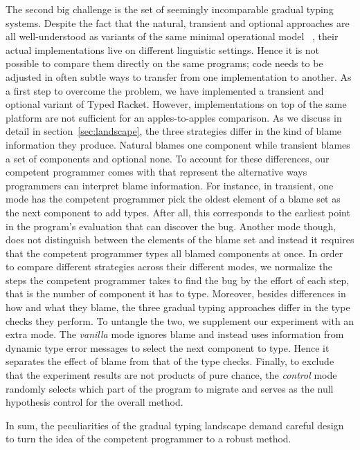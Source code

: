 The second big challenge is the set of seemingly incomparable gradual
typing systems. Despite the fact that the natural, transient and optional
approaches are all well-understood as variants of the same minimal operational model
~\cite{gf-icfp-2018, gfd-oopsla-2019}, their actual implementations live on
different linguistic settings. Hence it is not possible to compare them directly 
on the same programs; code needs to be adjusted in often subtle ways to
transfer from one implementation to another. As a first step to overcome the problem, 
we have implemented a transient and optional variant of Typed Racket.  
However,
implementations on top of the same platform are not sufficient for an
apples-to-apples comparison. As we discuss in detail in
section~\ref{sec:landscape}, the three strategies differ in the kind of
blame information they produce. Natural blames one component while
transient blames a set of components and optional none. To account for these
differences, our competent programmer comes with  that represent 
the alternative ways programmers can interpret blame information. For instance, in
transient, one mode  has the competent programmer pick the oldest element of a blame set 
as the next component to add types. After all, this corresponds to the
earliest point in the program's evaluation that can discover the bug. 
Another mode though, does not distinguish between the elements of the
blame set and instead it requires that the competent programmer types 
all blamed components at once. In order to compare different strategies
across their different modes, we normalize the steps the competent
programmer takes to find the bug by the effort of each step, that is the
number of component it has to type. Moreover, besides differences in how
and what they blame, the three gradual typing approaches differ in the type checks they perform. 
To untangle the two, we supplement our experiment with an extra mode. The \emph{vanilla} mode
ignores blame and instead uses information from dynamic type error messages to
select the next component to type. Hence it separates the effect of blame 
from that of the type checks. Finally, to exclude that the experiment
results are not products of pure chance, the \emph{control} mode randomly
selects which part of the program to migrate and serves as the null hypothesis
control for the overall method.

In sum, the peculiarities of the gradual typing landscape demand careful
design to turn the idea of the competent programmer to a robust method. 
